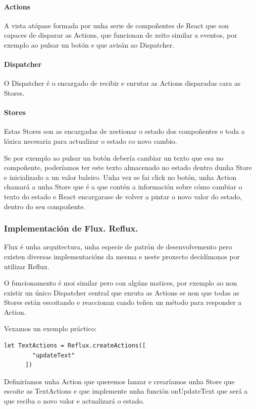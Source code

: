         \paragraph{Actions}
        A vista atópase formada por unha serie de compoñentes de React que son 
capaces de disparar as Actions, que funcionan de xeito similar a eventos, por 
exemplo ao pulsar un botón e que avisán ao Dispatcher.
        \paragraph{Dispatcher}
        O Dispatcher é o encargado de recibir e enrutar as Actions disparadas 
cara as Stores.
        \paragraph{Stores}
        Estas Stores son as encargadas de xestionar o estado dos compoñentes e 
toda a lóxica necesaria para actualizar o estado co novo cambio.

        Se por exemplo ao pulsar un botón debería cambiar un texto que esa no 
compoñente, poderíamos ter este texto almacenado no estado dentro dunha Store e 
inicializado a un valor baleiro.
        Unha vez se fai click no botón, unha Action chamará a unha Store que é 
a que contén a información sobre cómo cambiar o texto do estado e React 
encargarase de volver a pintar o novo valor do estado, dentro do seu compoñente.

      \subsubsection{Implementación de Flux. Reflux.}
      Flux é unha arquitectura, unha especie de patrón de desenvolvemento pero 
existen diversas implementacións da mesma e neste proxecto decidímonos por 
utilizar Reflux.

      O funcionamento é moi similar pero con algúns matices, por exemplo ao non 
existir un único Dispatcher central que enruta as Actions se non que todas as 
Stores están escoitando e reaccionan cando teñen un método para responder a 
Action.

     Vexamos un exemplo práctico:

     \begin{lstlisting}[frame=single]
      let TextActions = Reflux.createActions([
        "updateText"
      ])
    \end{lstlisting}

    Definiríamos unha Action que queremos lanzar e crearíamos unha Store que 
escoite as TextActions e que implemente unha función onUpdateText que será a 
que reciba o novo valor e actualizará o estado.

